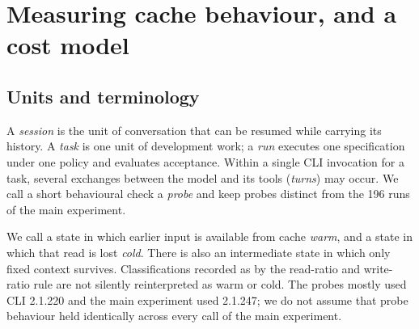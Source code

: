 \documentclass[a4paper,11pt]{article}
\newcommand{\spec}[1]{\texttt{\detokenize{#1}}}
\begin{document}
\section{Measuring cache behaviour, and a cost model}\label{sec:model}
\subsection{Units and terminology}
A \emph{session} is the unit of conversation that can be resumed while carrying its history. A \emph{task} is one unit of development work; a \emph{run} executes one specification under one policy and evaluates acceptance. Within a single CLI invocation for a task, several exchanges between the model and its tools (\emph{turns}) may occur. We call a short behavioural check a \emph{probe} and keep probes distinct from the 196 runs of the main experiment.

We call a state in which earlier input is available from cache \emph{warm}, and a state in which that read is lost \emph{cold}. There is also an intermediate state in which only fixed context survives. Classifications recorded as \spec{ambiguous} by the read-ratio and write-ratio rule are not silently reinterpreted as warm or cold. The probes mostly used CLI 2.1.220 and the main experiment used 2.1.247; we do not assume that probe behaviour held identically across every call of the main experiment.
\end{document}

